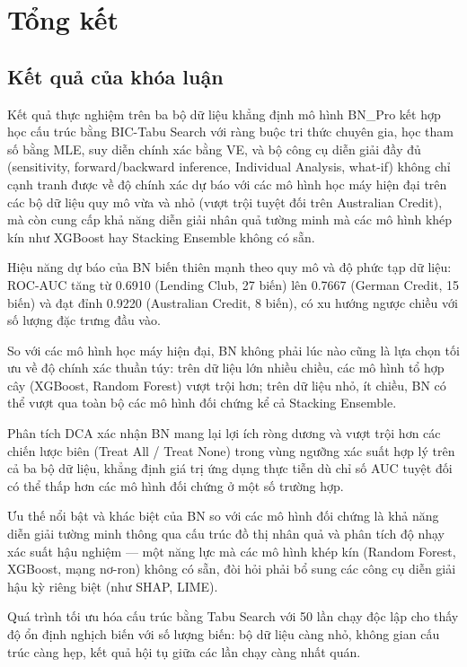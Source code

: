 \section{Tổng kết}

\subsection{Kết quả của khóa luận}

\noindent
Kết quả thực nghiệm trên ba bộ dữ liệu khẳng định mô hình BN\_Pro kết hợp học cấu trúc bằng BIC-Tabu Search với ràng buộc tri thức chuyên gia, học tham số bằng MLE, suy diễn chính xác bằng VE, và bộ công cụ diễn giải đầy đủ (sensitivity, forward/backward inference, Individual Analysis, what-if) không chỉ cạnh tranh được về độ chính xác dự báo với các mô hình học máy hiện đại trên các bộ dữ liệu quy mô vừa và nhỏ (vượt trội tuyệt đối trên Australian Credit), mà còn cung cấp khả năng diễn giải nhân quả tường minh mà các mô hình khép kín như XGBoost hay Stacking Ensemble không có sẵn.

Hiệu năng dự báo của BN biến thiên mạnh theo quy mô và độ phức tạp dữ liệu: ROC-AUC tăng từ 0.6910 (Lending Club, 27 biến) lên 0.7667 (German Credit, 15 biến) và đạt đỉnh 0.9220 (Australian Credit, 8 biến), có xu hướng ngược chiều với số lượng đặc trưng đầu vào.


So với các mô hình học máy hiện đại, BN không phải lúc nào cũng là lựa chọn tối ưu về độ chính xác thuần túy: trên dữ liệu lớn nhiều chiều, các mô hình tổ hợp cây (XGBoost, Random Forest) vượt trội hơn; trên dữ liệu nhỏ, ít chiều, BN có thể vượt qua toàn bộ các mô hình đối chứng kể cả Stacking Ensemble.


Phân tích DCA xác nhận BN mang lại lợi ích ròng dương và vượt trội hơn các chiến lược biên (Treat All / Treat None) trong vùng ngưỡng xác suất hợp lý trên cả ba bộ dữ liệu, khẳng định giá trị ứng dụng thực tiễn dù chỉ số AUC tuyệt đối có thể thấp hơn các mô hình đối chứng ở một số trường hợp.

Ưu thế nổi bật và khác biệt của BN so với các mô hình đối chứng là khả năng diễn giải tường minh thông qua cấu trúc đồ thị nhân quả và phân tích độ nhạy xác suất hậu nghiệm — một năng lực mà các mô hình khép kín (Random Forest, XGBoost, mạng nơ-ron) không có sẵn, đòi hỏi phải bổ sung các công cụ diễn giải hậu kỳ riêng biệt (như SHAP, LIME).


Quá trình tối ưu hóa cấu trúc bằng Tabu Search với 50 lần chạy độc lập cho thấy độ ổn định nghịch biến với số lượng biến: bộ dữ liệu càng nhỏ, không gian cấu trúc càng hẹp, kết quả hội tụ giữa các lần chạy càng nhất quán.


